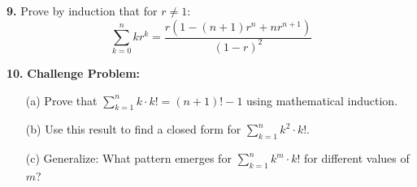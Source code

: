 \documentclass[12pt]{article}
\begin{document}
\textbf{9.} Prove by induction that for $r \neq 1$:
$$\sum_{k=0}^{n} kr^k = \frac{r(1-(n+1)r^n+nr^{n+1})}{(1-r)^2}$$
\vspace{6cm}

\textbf{10.} \textbf{Challenge Problem:} 

\begin{enumerate}
\item[(a)] Prove that $\sum_{k=1}^{n} k \cdot k! = (n+1)! - 1$ using mathematical induction.
\vspace{4cm}

\item[(b)] Use this result to find a closed form for $\sum_{k=1}^{n} k^2 \cdot k!$.
\vspace{4cm}

\item[(c)] Generalize: What pattern emerges for $\sum_{k=1}^{n} k^m \cdot k!$ for different values of $m$?
\vspace{3cm}
\end{enumerate}
\end{document}
